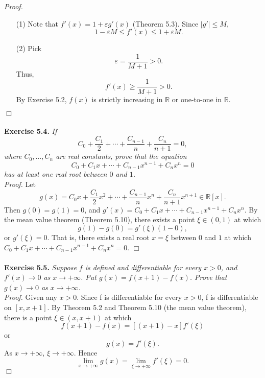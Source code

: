 \documentclass{article}
\begin{document}
\emph{Proof.}
\begin{enumerate}
\item[(1)]
Note that
$f'(x) = 1 + \varepsilon g'(x)$ (Theorem 5.3).
Since $|g'|\leq M$,
\[
  1 - \varepsilon M \leq f'(x) \leq 1 + \varepsilon M.
\]

\item[(2)]
Pick
\[
  \varepsilon = \frac{1}{M+1} > 0.
\]
Thus,
\[
  f'(x) \geq \frac{1}{M+1} > 0.
\]
By Exercise 5.2, $f(x)$ is strictly increasing in $\mathbb{R}$ or one-to-one in $\mathbb{R}$.
\end{enumerate}
$\Box$ \\\\






\textbf{Exercise 5.4.}
\emph{If
$$C_0 + \frac{C_1}{2} + \cdots + \frac{C_{n- 1}}{n} + \frac{C_n}{n + 1} = 0,$$
where $C_0, \ldots, C_n$ are real constants, prove that the equation
$$C_0 + C_1 x + \cdots + C_{n - 1} x^{n - 1} + C_n x^n = 0$$
has at least one real root between $0$ and $1$.} \\

\emph{Proof.}
Let
$$g(x) = C_0 x + \frac{C_1}{2} x^2 + \cdots + \frac{C_{n- 1}}{n} x^n + \frac{C_n}{n + 1} x^{n + 1}
\in \mathbb{R}[x].$$
Then $g(0) = g(1) = 0$, and
$g'(x) = C_0 + C_1 x + \cdots + C_{n - 1} x^{n - 1} + C_n x^n$.
By the mean value theorem (Theorem 5.10), there exists a point $\xi \in (0, 1)$ at which
$$g(1) - g(0) = g'(\xi)(1 - 0),$$
or $g'(\xi) = 0.$ That is, there exists a real root $x = \xi$ between $0$ and $1$
at which $C_0 + C_1 x + \cdots + C_{n - 1} x^{n - 1} + C_n x^n = 0$.
$\Box$ \\\\






\textbf{Exercise 5.5.}
\emph{Suppose $f$ is defined and differentiable for every $x > 0$,
and $f'(x) \to 0$ as $x \to +\infty$.
Put $g(x) = f(x+1) - f(x)$.
Prove that $g(x) \to 0$ as $x \to +\infty$.} \\

\emph{Proof.}
Given any $x > 0$.
Since f is differentiable for every $x > 0$,
f is differentiable on $[x,x+1]$.
By Theorem 5.2 and Theorem 5.10 (the mean value theorem),
there is a point $\xi \in (x,x+1)$ at which
\[
  f(x+1) - f(x) = [(x+1) - x ]f'(\xi)
\]
or
\[
  g(x) = f'(\xi).
\]
As $x \to +\infty$, $\xi \to +\infty$.
Hence
\[
  \lim_{x \to +\infty} g(x)
  = \lim_{\xi \to +\infty} f'(\xi) = 0.
\]
$\Box$ \\\\
\end{document}
